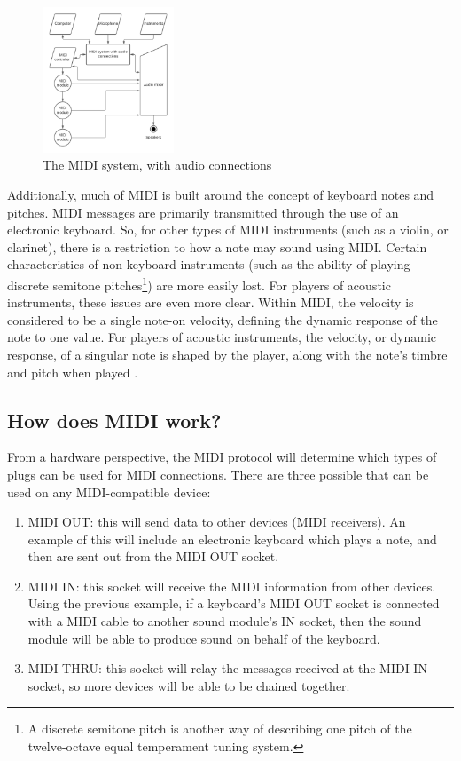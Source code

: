 \begin{figure}
	\centering
	\includegraphics[width=0.35\textwidth]{figures/midi-system-with-audio-connections.png}
	\caption{The MIDI system, with audio connections}
	\label{fig:midi-system-with-audio-connections}
\end{figure}

Additionally, much of MIDI is built around the concept of keyboard notes and pitches. MIDI messages are primarily transmitted through the use of an electronic keyboard. So, for other types of MIDI instruments (such as a violin, or clarinet), there is a restriction to how a note may sound using MIDI. Certain characteristics of non-keyboard instruments (such as the ability of playing discrete semitone pitches\footnote{A discrete semitone pitch is another way of describing one pitch of the twelve-octave equal temperament tuning system.}) are more easily lost. For players of acoustic instruments, these issues are even more clear. Within MIDI, the velocity is considered to be a single note-on velocity, defining the dynamic response of the note to one value. For players of acoustic instruments, the velocity, or dynamic response, of a singular note is shaped by the player, along with the note's timbre and pitch when played \cite{Kirk_Hunt_2013}.

\subsection[How does MIDI work?]{How does MIDI work?}\label{subsection:how-midi}
From a hardware perspective, the MIDI protocol will determine which types of plugs can be used for MIDI connections. There are three possible  that can be used on any MIDI-compatible device:

\begin{enumerate}
	\item MIDI OUT: this will send data to other devices (MIDI receivers). An example of this will include an electronic keyboard which plays a note, and then  are sent out from the MIDI OUT socket.
	\item MIDI IN: this socket will receive the MIDI information from other devices. Using the previous example, if a keyboard's MIDI OUT socket is connected with a MIDI cable to another sound module's IN socket, then the sound module will be able to produce sound on behalf of the keyboard.
	\item MIDI THRU: this socket will relay the messages received at the MIDI IN socket, so more devices will be able to be chained together.
\end{enumerate}

